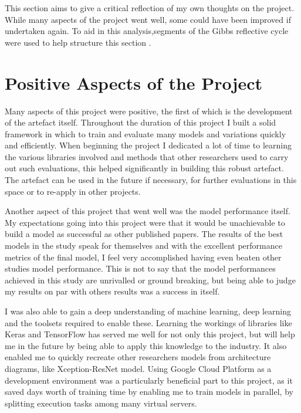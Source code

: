 This section aims to give a critical reflection of my own thoughts on the project. While many aspects of the project went well, some could have been improved if undertaken again. To aid in this analysis,segments of the Gibbs reflective cycle were used to help structure this section \citep{gibbs1988learning}.

\section{Positive Aspects of the Project}
Many aspects of this project were positive, the first of which is the development of the artefact itself. Throughout the duration of this project I built a solid framework in which to train and evaluate many models and variations quickly and efficiently. When beginning the project I dedicated a lot of time to learning the various libraries involved and methods that other researchers used to carry out such evaluations, this helped significantly in building this robust artefact. The artefact can be used in the future if necessary, for further evaluations in this space or to re-apply in other projects.

Another aspect of this project that went well was the model performance itself. My expectations going into this project were that it would be unachievable to build a model as successful as other published papers. The results of the best models in the study speak for themselves and with the excellent performance metrics of the final model, I feel very accomplished having even beaten other studies model performance. This is not to say that the model performances achieved in this study are unrivalled or ground breaking, but being able to judge my results on par with others results was a success in itself.

I was also able to gain a deep understanding of machine learning, deep learning and the toolsets required to enable these. Learning the workings of libraries like Keras and TensorFlow has served me well for not only this project, but will help me in the future by being able to apply this knowledge to the industry. It also enabled me to quickly recreate other researchers models from architecture diagrams, like \cite{fitriasari2021improvement} Xception-ResNet model. Using Google Cloud Platform as a development environment was a particularly beneficial part to this project, as it saved days worth of training time by enabling me to train models in parallel, by splitting execution tasks among many virtual servers.

